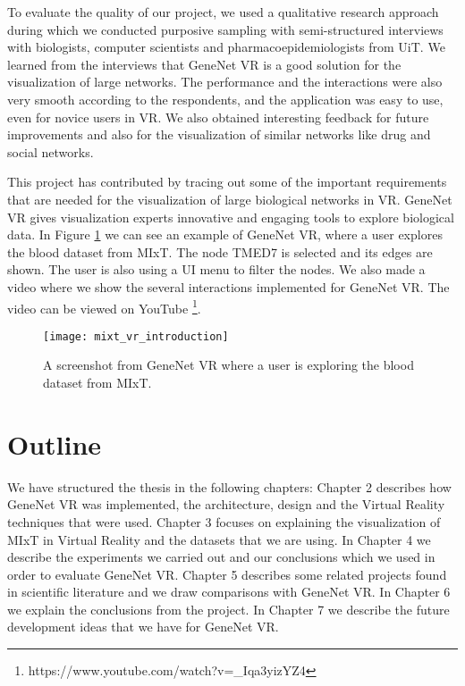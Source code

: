 To evaluate the quality of our project, we used a qualitative research approach during which we conducted purposive sampling with semi-structured interviews with biologists, computer scientists and pharmacoepidemiologists from UiT. We learned from the interviews that GeneNet VR is a good solution for the visualization of large networks. The performance and the interactions were also very smooth according to the respondents, and the application was easy to use, even for novice users in VR. We also obtained interesting feedback for future improvements and also for the visualization of similar networks like drug and social networks.

This project has contributed by tracing out some of the important requirements that are needed for the visualization of large biological networks in VR. GeneNet VR gives visualization experts innovative and engaging tools to explore biological data. In Figure \ref{fig:bignet_intro} we can see an example of GeneNet VR, where a user explores the blood dataset from MIxT. The node TMED7 is selected and its edges are shown. The user is also using a UI menu to filter the nodes. We also made a video where we show the several interactions implemented for GeneNet VR. The video can be viewed on YouTube \footnote{https://www.youtube.com/watch?v=\_Iqa3yizYZ4}.

\begin{figure}[h!]
    \newlength{\tempheight}
    \setlength{\tempheight}{15ex}
    \centering
    \texttt{[image: mixt\_vr\_introduction]}
    \caption{A screenshot from GeneNet VR where a user is exploring the blood dataset from MIxT.}
    \label{fig:bignet_intro}
\end{figure}


\section{Outline}

We have structured the thesis in the following chapters: Chapter 2 describes how GeneNet VR was implemented, the architecture, design and the Virtual Reality techniques that were used. Chapter 3 focuses on explaining the visualization of MIxT in Virtual Reality and the datasets that we are using. In Chapter 4 we describe the experiments we carried out and our conclusions which we used in order to evaluate GeneNet VR. Chapter 5 describes some related projects found in scientific literature and we draw comparisons with GeneNet VR. In Chapter 6 we explain the conclusions from the project. In Chapter 7 we describe the future development ideas that we have for GeneNet VR.
